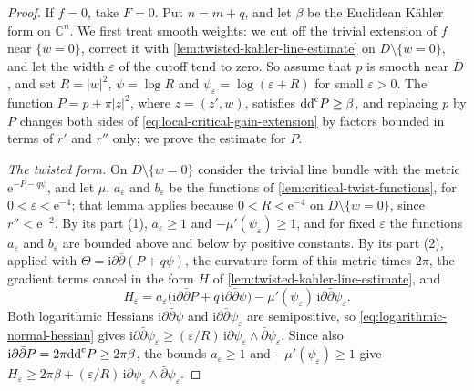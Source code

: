 \begin{proof}
If $f=0$, take $F=0$. Put $n=m+q$, and let $\beta$ be the Euclidean K\"ahler form on $\mathbb C^n$. We first treat smooth weights: we cut off the trivial extension of $f$ near $\{w=0\}$, correct it with \cref{lem:twisted-kahler-line-estimate} on $D\setminus\{w=0\}$, and let the width $\varepsilon$ of the cutoff tend to zero. So assume that $p$ is smooth near $\overline D$, and set $R=|w|^2$, $\psi=\log R$ and $\psi_\varepsilon=\log(\varepsilon+R)$ for small $\varepsilon>0$. The function $P=p+\pi|z|^2$, where $z=(z',w)$, satisfies $\mathrm{dd}^{\mathrm{c}} P\geq\beta$, and replacing $p$ by $P$ changes both sides of \eqref{eq:local-critical-gain-extension} by factors bounded in terms of $r'$ and $r''$ only; we prove the estimate for $P$.

\emph{The twisted form.} On $D\setminus\{w=0\}$ consider the trivial line bundle with the metric $\mathrm e^{-P-q\psi}$, and let $\mu$, $a_\varepsilon$ and $b_\varepsilon$ be the functions of \cref{lem:critical-twist-functions}, for $0<\varepsilon<\mathrm e^{-4}$; that lemma applies because $0<R<\mathrm e^{-4}$ on $D\setminus\{w=0\}$, since $r''<\mathrm e^{-2}$. By its part (1), $a_\varepsilon\geq1$ and $-\mu'(\psi_\varepsilon)\geq1$, and for fixed $\varepsilon$ the functions $a_\varepsilon$ and $b_\varepsilon$ are bounded above and below by positive constants. By its part (2), applied with $\Theta=\mathrm i\partial\bar\partial(P+q\psi)$, the curvature form of this metric times $2\pi$, the gradient terms cancel in the form $H$ of \cref{lem:twisted-kahler-line-estimate}, and
\[
 H_\varepsilon=a_\varepsilon\bigl(\mathrm i\partial\bar\partial P
                         +q\,\mathrm i\partial\bar\partial\psi\bigr)
                -\mu'(\psi_\varepsilon)\,
                         \mathrm i\partial\bar\partial\psi_\varepsilon.
\]
Both logarithmic Hessians $\mathrm i\partial\bar\partial\psi$ and $\mathrm i\partial\bar\partial\psi_\varepsilon$ are semipositive, so \eqref{eq:logarithmic-normal-hessian} gives $\mathrm i\partial\bar\partial\psi_\varepsilon\geq(\varepsilon/R)\,\mathrm i\partial\psi_\varepsilon\wedge\bar\partial\psi_\varepsilon$. Since also $\mathrm i\partial\bar\partial P=2\pi\mathrm{dd}^{\mathrm{c}} P\geq2\pi\beta$, the bounds $a_\varepsilon\geq1$ and $-\mu'(\psi_\varepsilon)\geq1$ give $H_\varepsilon\geq2\pi\beta+(\varepsilon/R)\,\mathrm i\partial\psi_\varepsilon\wedge\bar\partial\psi_\varepsilon$.


\end{proof}
